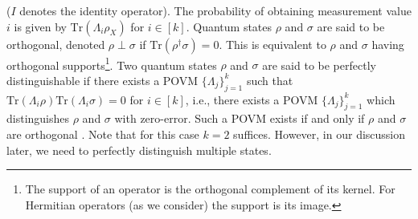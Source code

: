 \documentclass[journal, onecolumn, draftcls]{IEEEtran}
\theoremstyle{definition}
\newcommand{\calH}{\mathcal{H}}
\newcommand{\calL}{\mathcal{L}}
\newcommand{\Tr}{\textrm{Tr}}
\newcommand{\meng}[1]{\marginpar{+}{\bf Ruoyu's remark}: {\em #1}}
\newcommand{\aditya}[1]{\marginpar{+}{\bf Aditya's remark}: {\em #1}}
\begin{document}
 ($I$ denotes the identity operator). The probability of obtaining measurement value $i$ is given by $\Tr \left(\Lambda_i \rho_X \right)$ for $i \in [k]$. Quantum states $\rho$ and $\sigma$ are said to be orthogonal, denoted $\rho \perp \sigma$ if $\Tr (\rho^{\dagger} \sigma) = 0$. This is equivalent to $\rho$ and $\sigma$ having orthogonal supports\footnote{The support of an operator is the orthogonal complement of its kernel. For Hermitian operators (as we consider) the support is its image.}. Two  quantum states $\rho$ and $\sigma$ are said to be perfectly distinguishable if there exists a POVM $\{\Lambda_j\}_{j=1}^{k}$ such that $\Tr \left(\Lambda_i \rho \right)\Tr \left(\Lambda_i \sigma \right) = 0$ for $i \in [k]$, i.e., there exists a POVM $\{\Lambda_j\}_{j=1}^{k}$ which distinguishes $\rho$ and $\sigma$ with zero-error. Such a POVM exists if and only if $\rho$ and $\sigma$ are orthogonal \cite{MEDEIROSD05}. Note that for this case $k=2$ suffices. However, in our discussion later, we need to perfectly distinguish multiple states. 
 
 
 
\end{document}
